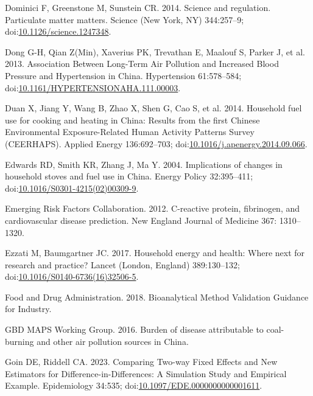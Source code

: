 \documentclass[
  letterpaper,
  DIV=11,
  numbers=noendperiod]{scrartcl}
\newlength{\cslhangindent}
\newenvironment{CSLReferences}[2] %
 {\begin{list}{}{%
  \setlength{\itemindent}{0pt}
  \setlength{\leftmargin}{0pt}
  \setlength{\parsep}{0pt}
  \ifodd #1
   \setlength{\leftmargin}{\cslhangindent}
   \setlength{\itemindent}{-1\cslhangindent}
  \fi
  \setlength{\itemsep}{#2\baselineskip}}}
 {\end{list}}
\begin{document}
\begin{CSLReferences}{1}{1}
Dominici F, Greenstone M, Sunstein CR. 2014. Science and regulation.
{Particulate} matter matters. Science (New York, NY) 344:257--9;
doi:\href{https://doi.org/10.1126/science.1247348}{10.1126/science.1247348}.

Dong G-H, Qian Z(Min), Xaverius PK, Trevathan E, Maalouf S, Parker J, et
al. 2013. Association {Between Long-Term Air Pollution} and {Increased
Blood Pressure} and {Hypertension} in {China}. Hypertension 61:578--584;
doi:\href{https://doi.org/10.1161/HYPERTENSIONAHA.111.00003}{10.1161/HYPERTENSIONAHA.111.00003}.

Duan X, Jiang Y, Wang B, Zhao X, Shen G, Cao S, et al. 2014. Household
fuel use for cooking and heating in {China}: {Results} from the first
{Chinese Environmental Exposure-Related Human Activity Patterns Survey}
({CEERHAPS}). Applied Energy 136:692--703;
doi:\href{https://doi.org/10.1016/j.apenergy.2014.09.066}{10.1016/j.apenergy.2014.09.066}.

Edwards RD, Smith KR, Zhang J, Ma Y. 2004. Implications of changes in
household stoves and fuel use in {China}. Energy Policy 32:395--411;
doi:\href{https://doi.org/10.1016/S0301-4215(02)00309-9}{10.1016/S0301-4215(02)00309-9}.

Emerging Risk Factors Collaboration. 2012. C-reactive protein,
fibrinogen, and cardiovascular disease prediction. New England Journal
of Medicine 367: 1310--1320.

Ezzati M, Baumgartner JC. 2017. Household energy and health: Where next
for research and practice? Lancet (London, England) 389:130--132;
doi:\href{https://doi.org/10.1016/S0140-6736(16)32506-5}{10.1016/S0140-6736(16)32506-5}.

Food and Drug Administration. 2018. Bioanalytical {Method Validation
Guidance} for {Industry}.

GBD MAPS Working Group. 2016. Burden of disease attributable to
coal-burning and other air pollution sources in {China}.

Goin DE, Riddell CA. 2023. Comparing {Two-way Fixed Effects} and {New
Estimators} for {Difference-in-Differences}: {A Simulation Study} and
{Empirical Example}. Epidemiology 34:535;
doi:\href{https://doi.org/10.1097/EDE.0000000000001611}{10.1097/EDE.0000000000001611}.


\end{CSLReferences}
\end{document}
